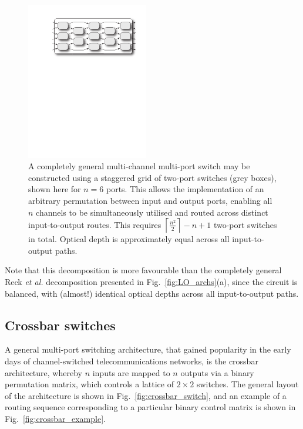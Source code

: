 \begin{figure}[!htbp]
\includegraphics[clip=true, width=0.475\textwidth]{multi_channel_multi_port_switch}
\captionspacefig \caption{A completely general multi-channel multi-port switch may be constructed using a staggered grid of two-port switches (grey boxes), shown here for \mbox{$n=6$} ports. This allows the implementation of an arbitrary permutation between input and output ports, enabling all $n$ channels to be simultaneously utilised and routed across distinct input-to-output routes. This requires \mbox{$\left\lceil \frac{n^2}{2}\right\rceil - n + 1$} two-port switches in total. Optical depth is approximately equal across all input-to-output paths.} \label{fig:multi_channel_multi_port_switch} 	
\end{figure}

Note that this decomposition is more favourable than the completely general Reck \textit{et al.} decomposition presented in Fig.~\ref{fig:LO_archs}(a), since the circuit is balanced, with (almost!) identical optical depths across all input-to-output paths.

%
%

\subsection{Crossbar switches}

A general multi-port switching architecture, that gained popularity in the early days of channel-switched telecommunications networks, is the crossbar architecture, whereby $n$ inputs are mapped to $n$ outputs via a binary permutation matrix, which controls a lattice of \mbox{$2\times 2$} switches. The general layout of the architecture is shown in Fig.~\ref{fig:crossbar_switch}, and an example of a routing sequence corresponding to a particular binary control matrix is shown in Fig.~\ref{fig:crossbar_example}.

